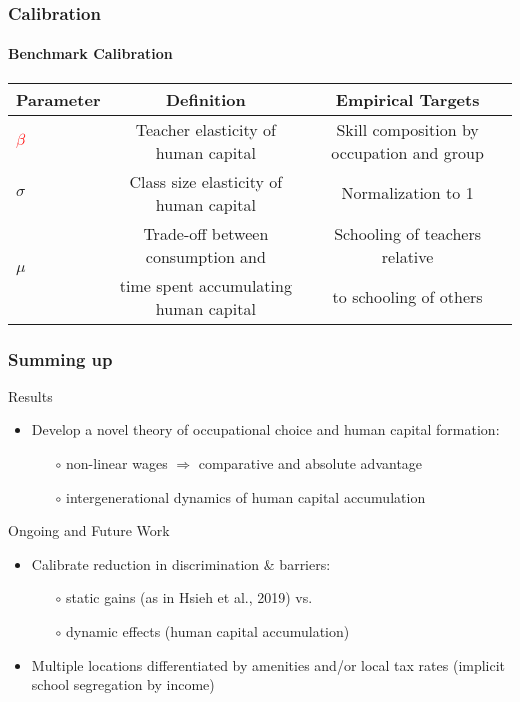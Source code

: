 \documentclass[11pt]{beamer}
\begin{document}
		\begin{frame}
			\frametitle{Calibration}
			\framesubtitle{Benchmark Calibration}
			\tiny
			\begin{table}[h!]
				\centering
				\begin{tabular}{lcc}
					\toprule
					\toprule
					Parameter & Definition & Empirical Targets\\
					\midrule
					\textcolor{red}{$\beta$} & Teacher elasticity of human capital & Skill composition by occupation and group \\
					$\sigma$ & Class size elasticity of human capital & Normalization to 1\\
					\multirow{2}{*}{$\mu$} &  Trade-off between consumption and & Schooling of teachers relative\\
					& time spent accumulating human capital & to schooling of others\\
					\bottomrule
				\end{tabular}
				\label{tab:calibr}
			\end{table}
		\end{frame}
		
			
		
		\begin{frame}
			\frametitle{Summing up}
			\textcolor{tblue}{Results}
			\begin{itemize}
				\item Develop a novel theory of occupational choice and human capital formation: 
				\begin{itemize}
					\item[$\circ$] non-linear wages $\Rightarrow$ comparative and absolute advantage
					\item[$\circ$] intergenerational dynamics of human capital accumulation
				\end{itemize}
			\end{itemize}
			\vfill
			\textcolor{tblue}{Ongoing and Future Work}
			\begin{itemize}
				\item Calibrate reduction in discrimination \& barriers:
				\begin{itemize}
					\item[$\circ$] static gains (as in Hsieh et al., 2019) vs.
					\item[$\circ$] dynamic effects (human capital accumulation)
				\end{itemize}
				\item Multiple locations differentiated by amenities and/or local tax rates (implicit school segregation by income)
			\end{itemize}
		\end{frame}
		
\end{document}
